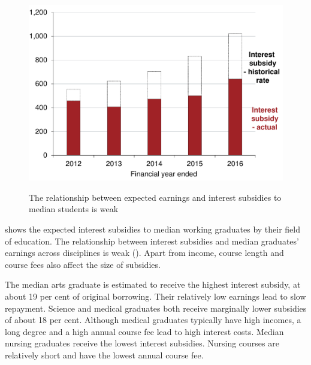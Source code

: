 \documentclass[embargoed]{grattan}
\begin{document}
\begin{figure}
\caption{The relationship between expected earnings and interest subsidies to median students is weak}\label{fig:fig9-relationship-expected-earnings-interest-subsides-to-median-students-weak}

\includegraphics[page=9]{atlas/Chartpack.pdf}
%
{\textcites{DET2015FundingClusters}{ABS2012Censuspopulationhousing}}
\end{figure}

 shows the expected interest subsidies to median working graduates by their field of education.
The relationship between interest subsidies and median graduates' earnings across disciplines is weak ().
Apart from income, course length and course fees also affect the size of subsidies.

The median arts graduate is estimated to receive the highest interest subsidy, at about 19 per cent of original borrowing.
Their relatively low earnings lead to slow repayment.
Science and medical graduates both receive marginally lower subsidies of about 18 per cent.
Although medical graduates typically have high incomes, a long degree and a high annual course fee lead to high interest costs.
Median nursing graduates receive the lowest interest subsidies.
Nursing courses are relatively short and have the lowest annual course fee.
\end{document}

